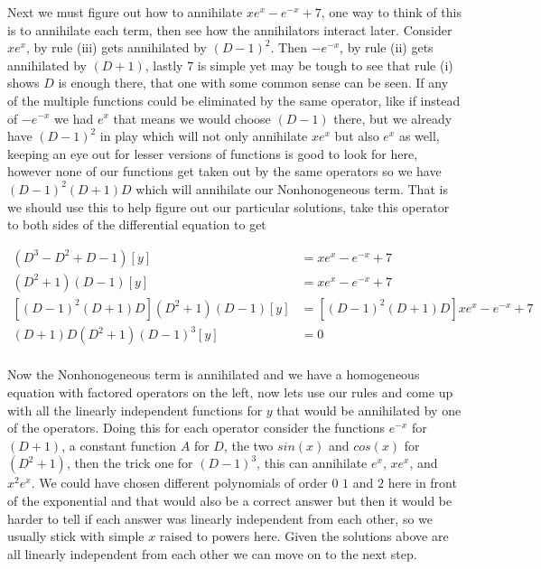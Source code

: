 \documentclass[12pt]{article}
\begin{document}
Next we must figure out how to annihilate $xe^{x}-e^{-x}+7$, one way to think of this is to annihilate each term, then see how the annihilators interact later. Consider $xe^x$, by rule (iii) gets annihilated by $(D-1)^2$. Then $-e^{-x}$, by rule (ii) gets annihilated by $(D+1)$, lastly $7$ is simple yet may be tough to see that rule (i) shows $D$ is enough there, that one with some common sense can be seen. If any of the multiple functions could be eliminated by the same operator, like if instead of $-e^{-x}$ we had $e^{x}$ that means we would choose $(D-1)$ there, but we already have $(D-1)^2$ in play which will not only annihilate $xe^x$ but also $e^x$ as well, keeping an eye out for lesser versions of functions is good to look for here, however none of our functions get taken out by the same operators so we have $(D-1)^2(D+1)D$ which will annihilate our Nonhonogeneous term. That is we should use this to help figure out our particular solutions, take this operator to both sides of the differential equation to get

\begin{align*}
    (D^3-D^2+D-1)[y]&=xe^{x}-e^{-x}+7 \\
    (D^2+1)(D-1)[y]&=xe^{x}-e^{-x}+7 \\
    [(D-1)^2(D+1)D](D^2+1)(D-1)[y]&=[(D-1)^2(D+1)D]xe^{x}-e^{-x}+7 \\
    (D+1)D(D^2+1)(D-1)^3[y]&=0 \\
\end{align*}

Now the Nonhonogeneous term is annihilated and we have a homogeneous equation with factored operators on the left, now lets use our rules and come up with all the linearly independent functions for $y$ that would be annihilated by one of the operators. Doing this for each operator consider the functions $e^{-x}$ for $(D+1)$, a constant function $A$ for $D$, the two $sin(x)$ and $cos(x)$ for $(D^2+1)$, then the trick one for $(D-1)^3$, this can annihilate $e^{x}$, $xe^{x}$, and $x^2e^{x}$. We could have chosen different polynomials of order $0$ $1$ and $2$ here in front of the exponential and that would also be a correct answer but then it would be harder to tell if each answer was linearly independent from each other, so we usually stick with simple $x$ raised to powers here. Given the solutions above are all linearly independent from each other we can move on to the next step. \\
\end{document}
